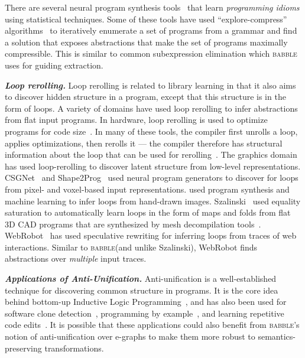 \documentclass[acmsmall,screen,nonacm,review=false,timestamp=false]{acmart}
\newcommand{\emphbf}[1]{\emph{\textbf{#1}\xspace}}
\newcommand{\mypara}[1]{\smallskip\noindent\emphbf{#1.}\xspace}
\newcommand{\tname}[1]{\textsc{#1}\xspace}
\newcommand{\tool}{\tname{babble}}
\begin{document}
There are several neural program synthesis tools~\cite{polozov, srini, learner, gredilla}
  that learn \emph{programming idioms}
  using statistical techniques.
Some of these tools have used
  ``explore-compress'' algorithms~\cite{learner} to
  iteratively enumerate a set of
  programs from a grammar and find a solution
  that exposes abstractions that make the set of
  programs maximally compressible.
This is similar to
  common subexpression elimination which \tool uses
  for guiding extraction.





\mypara{Loop rerolling}
Loop rerolling is related to library learning in that it also aims to discover hidden structure in a program,
except that this structure is in the form of loops.
A variety of domains have used loop rerolling
  to infer abstractions from flat input programs.
In hardware, loop rerolling is
  used to optimize programs
  for code size~\cite{hardware1, hardware2, hardware3}.
In many of these tools,
  the compiler first unrolls a loop,
  applies optimizations, then rerolls it --- the compiler
  therefore has structural information about the loop
  that can be used for rerolling~\cite{hardware1}.
The graphics domain has used
  loop-rerolling to discover
  latent structure from low-level representations.
CSGNet~\cite{csgnet} and Shape2Prog~\cite{shape2prog} used
  neural program generators to discover for loops from
  pixel- and voxel-based input representations.
\cite{handdrawn} used program synthesis
  and machine learning
  to infer loops from hand-drawn images.
Szalinski~\cite{szalinski} used
  equality saturation to
  automatically learn loops in the form
  of maps and folds
  from flat 3D CAD programs that are
  synthesized by mesh decompilation tools~\cite{reincarnate}.
WebRobot~\cite{webrobot} has used speculative
  rewriting for inferring loops from traces
  of web interactions.
Similar to \tool (and unlike Szalinski),
  WebRobot finds abstractions
  over \textit{multiple} input traces.


\mypara{Applications of Anti-Unification}
Anti-unification is a well-established technique for discovering common structure in programs.
It is the core idea behind bottom-up Inductive Logic Programming~\cite{ilp},
and has also been used for software clone detection~\cite{Bulychev10},
programming by example~\cite{raza2014programming},
and learning repetitive code edits~\cite{lase,refaser}.
It is possible that these applications could also benefit from \tool's notion of anti-unification over e-graphs
to make them more robust to semantics-preserving transformations.
\end{document}
